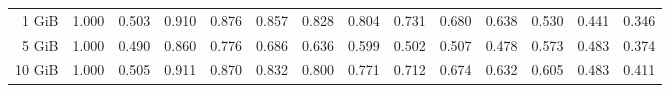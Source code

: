 \begin{centering}
\begin{table}[!h]
\begin{tabular}{rrrrrrrrrrrrrr}
		1 GiB   & 1.000 & 0.503 & 0.910 & 0.876 & 0.857 & 0.828 & 0.804 & 0.731 & 0.680 & 0.638 & 0.530 & 0.441 & 0.346 \\
		5 GiB   & 1.000 & 0.490 & 0.860 & 0.776 & 0.686 & 0.636 & 0.599 & 0.502 & 0.507 & 0.478 & 0.573 & 0.483 & 0.374 \\
		10 GiB  & 1.000 & 0.505 & 0.911 & 0.870 & 0.832 & 0.800 & 0.771 & 0.712 & 0.674 & 0.632 & 0.605 & 0.483 & 0.411 \\
		\bottomrule
	\end{tabular}
\end{table}
\end{centering}